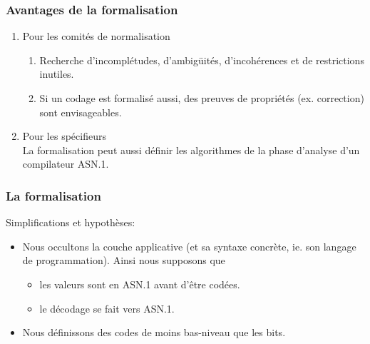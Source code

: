 \documentclass[compress,dvips,xcolor={dvipsnames},t]{beamer}
\begin{document}
\begin{frame}
\frametitle{Avantages de la formalisation}

\begin{enumerate}

  \item Pour les comités de normalisation

    \begin{enumerate}

      \item Recherche d'incomplétudes, d'ambigüités, d'incohérences et
        de restrictions inutiles.

      \item Si un codage est formalisé aussi, des preuves de
        propriétés (ex. correction) sont envisageables.

    \end{enumerate}

  \item Pour les spécifieurs \bigskip \\
    La formalisation peut aussi définir les algorithmes
    de la phase d'analyse d'un compilateur \mbox{ASN.1}.

\end{enumerate}

\end{frame}


\begin{frame}
\frametitle{La formalisation}

Simplifications et hypothèses:
\begin{itemize}

  \item Nous occultons la couche applicative (et sa syntaxe concrète,
        ie. son langage de programmation). Ainsi nous supposons que

    \begin{itemize}

      \item les valeurs sont en \mbox{ASN.1} avant d'être codées.

      \item le décodage se fait vers \mbox{ASN.1}.

    \end{itemize}

  \item Nous définissons des codes de moins bas-niveau que les bits.

\end{itemize}

\end{frame}
\end{document}

